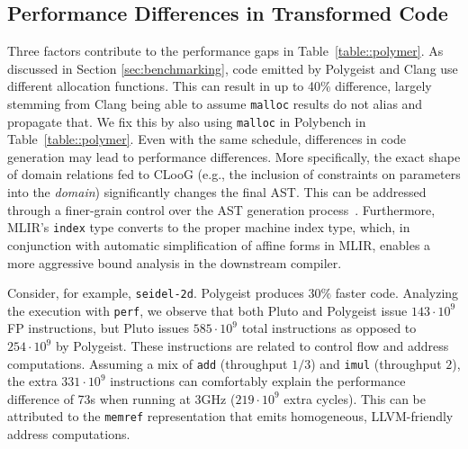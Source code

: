 \documentclass[sigplan]{acmart}
\newcommand{\icode}[1]{{\texttt {#1}}}
\newcommand{\tool}{Polygeist\xspace}
\newcommand{\memref}{\icode{memref}\xspace}
\newcommand{\polycc}{\icode{polycc}\xspace}
\begin{document}
\subsection{Performance Differences in Transformed Code}\label{sec:perf_analysis}

Three factors contribute to the performance gaps in Table~\ref{table::polymer}. As discussed in Section \ref{sec:benchmarking}, code emitted by \tool and Clang use different allocation functions. This can result in up to 40\% difference, largely stemming from Clang being able to assume \icode{malloc} results do not alias and propagate that. We fix this by also using \icode{malloc} in Polybench in Table~\ref{table::polymer}. Even with the same schedule, differences in code generation may lead to performance differences. More specifically, the exact shape of domain relations fed to CLooG (e.g., the inclusion of constraints on parameters into the \emph{domain}) significantly changes the final AST. This can be addressed through a finer-grain control over the AST generation process~\cite{grosser2015polyhedral}. Furthermore, MLIR's \icode{index} type converts to the proper machine index type, which, in conjunction with automatic simplification of affine forms in MLIR, enables a more aggressive bound analysis in the downstream compiler.

Consider, for example, \icode{seidel-2d}. \tool produces $30\%$ faster code. Analyzing the execution with \icode{perf}, we observe that both Pluto and \tool issue $143 \cdot 10^9$ FP instructions, but Pluto issues $585 \cdot 10^9$ total instructions as opposed to $254 \cdot 10^9$ by \tool. These instructions are related to control flow and address computations. Assuming a mix of \icode{add} (throughput $1/3$) and \icode{imul} (throughput $2$), the extra $331 \cdot 10^9$ instructions can comfortably explain the performance difference of 73s when running at 3GHz ($219 \cdot 10^9$ extra cycles). This can be attributed to the \memref representation that emits homogeneous, LLVM-friendly address computations.

\end{document}
